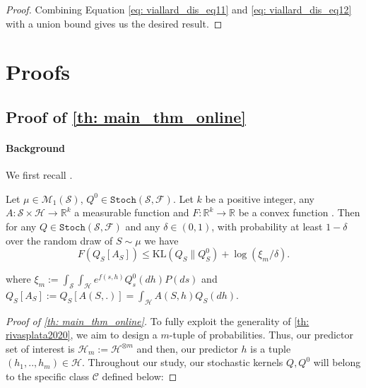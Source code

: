 \begin{noaddcontents}
\begin{proof}[Proof]
Combining Equation \cref{eq: viallard_dis_eq11} and \cref{eq: viallard_dis_eq12} with a union bound gives us the desired result.
\end{proof}











\section{Proofs}
\label{sec: proofs-chap3}

\subsection{Proof of \cref{th: main_thm_online}}

\label{sec: proof_main_thm_online}




\paragraph{Background} We first recall \cite[Thm 2]{rivasplata2020pac}.

\begin{theorem}
\label{th: rivasplata2020}
Let $\mu \in \mathcal{M}_{1}(\mathcal{S})$, $Q^{0} \in \texttt{Stoch}(\mathcal{S},\mathcal{F})$. Let $k$ be a positive integer,  any  $A: \mathcal{S} \times \mathcal{H} \rightarrow \mathbb{R}^{k}$ a measurable function and $F: \mathbb{R}^{k} \rightarrow \mathbb{R}$ be a convex function .
Then for any $Q \in \texttt{Stoch}(\mathcal{S},\mathcal{F})$ and any $\delta \in(0,1)$, with probability at least $1-\delta$ over the random draw of $S \sim \mu$ we have
$$
F\left(Q_{S}\left[A_{S}\right]\right) \leq \mathrm{KL}\left(Q_{S} \| Q_{S}^{0}\right)+\log (\xi_m / \delta) .
$$

where $\xi_m:=\int_{\mathcal{S}} \int_{\mathcal{H}} e^{f(s, h)} Q_{s}^{0}(d h) P(d s)$ and $Q_S[A_S]:= Q_S[A(S,.)]= \int_{\mathcal{H}} A(S,h) Q_S(dh)$.
\end{theorem}


\begin{proof}[Proof of \cref{th: main_thm_online}]


To fully exploit the generality of \cref{th: rivasplata2020}, we aim to design a $m$-tuple of probabilities. Thus, our predictor set of interest is $\mathcal{H}_m:= \mathcal{H}^{\otimes m}$ and then, our predictor $h$ is a tuple $(h_1,..,h_m)\in\mathcal{H}$. Throughout our study, our stochastic kernels $Q,Q^0$ will belong to the specific class $\mathcal{C}$ defined below:


\end{proof}
\end{noaddcontents}
